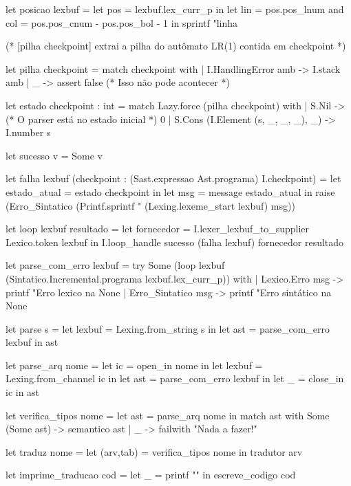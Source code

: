 \documentclass[12pt,a4paper,twoside]{article}
\begin{document}
\begin{terminal}
let posicao lexbuf =
    let pos = lexbuf.lex_curr_p in
    let lin = pos.pos_lnum
    and col = pos.pos_cnum - pos.pos_bol - 1 in
    sprintf "linha %

(* [pilha checkpoint] extrai a pilha do autômato LR(1) contida em checkpoint *)

let pilha checkpoint =
  match checkpoint with
  | I.HandlingError amb -> I.stack amb
  | _ -> assert false (* Isso não pode acontecer *)

let estado checkpoint : int =
  match Lazy.force (pilha checkpoint) with
  | S.Nil -> (* O parser está no estado inicial *)
     0
  | S.Cons (I.Element (s, _, _, _), _) ->
     I.number s

let sucesso v = Some v

let falha lexbuf (checkpoint : (Sast.expressao Ast.programa) I.checkpoint) =
  let estado_atual = estado checkpoint in
  let msg = message estado_atual in
  raise (Erro_Sintatico (Printf.sprintf "%
                                      (Lexing.lexeme_start lexbuf) msg))

let loop lexbuf resultado =
  let fornecedor = I.lexer_lexbuf_to_supplier Lexico.token lexbuf in
  I.loop_handle sucesso (falha lexbuf) fornecedor resultado


let parse_com_erro lexbuf =
  try
    Some (loop lexbuf (Sintatico.Incremental.programa lexbuf.lex_curr_p))
  with
  | Lexico.Erro msg ->
     printf "Erro lexico na %
     None
  | Erro_Sintatico msg ->
     printf "Erro sintático na %
     None

let parse s =
  let lexbuf = Lexing.from_string s in
  let ast = parse_com_erro lexbuf in
  ast

let parse_arq nome =
  let ic = open_in nome in
  let lexbuf = Lexing.from_channel ic in
  let ast = parse_com_erro lexbuf in
  let _ = close_in ic in
  ast

let verifica_tipos nome =
  let ast = parse_arq nome in
  match ast with
    Some (Some ast) -> semantico ast
  | _ -> failwith "Nada a fazer!\n"

let traduz nome =
  let (arv,tab) = verifica_tipos nome in
  tradutor arv

let imprime_traducao cod =
   let _ = printf "\n" in
   escreve_codigo cod

\end{terminal}
\end{document}
